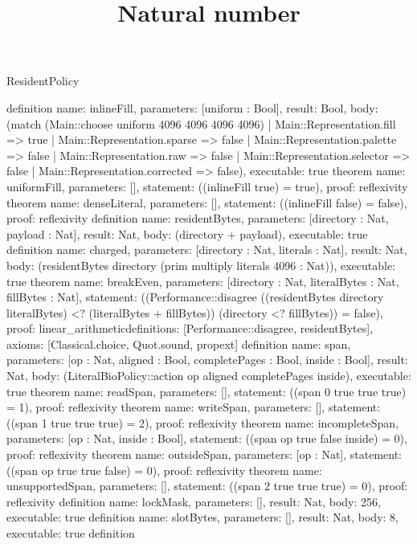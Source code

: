 \begin{lexlean}{ResidentPolicy}
\title{Natural number}
\begin{semanticmodule}
definition{
  name: inlineFill, parameters: [uniform : Bool], result: Bool,
  body: (match (Main::choose uniform 4096 4096 4096 4096)
    | Main::Representation.fill => true
    | Main::Representation.sparse => false
    | Main::Representation.palette => false
    | Main::Representation.raw => false
    | Main::Representation.selector => false
    | Main::Representation.corrected => false), executable: true
}
theorem{ name: uniformFill, parameters: [], statement: ((inlineFill true) = true), proof: reflexivity{} }
theorem{ name: denseLiteral, parameters: [], statement: ((inlineFill false) = false), proof: reflexivity{} }
definition{
  name: residentBytes, parameters: [directory : Nat, payload : Nat], result: Nat,
  body: (directory + payload), executable: true
}
definition{
  name: charged, parameters: [directory : Nat, literals : Nat], result: Nat,
  body: (residentBytes directory (prim multiply literals 4096 : Nat)), executable: true
}
theorem{
  name: breakEven, parameters: [directory : Nat, literalBytes : Nat, fillBytes : Nat],
  statement: ((Performance::disagree ((residentBytes directory literalBytes) <? (literalBytes + fillBytes))
    (directory <? fillBytes)) = false),
  proof: linear_arithmetic{definitions: [Performance::disagree, residentBytes]}, axioms: [Classical.choice, Quot.sound, propext]
}
definition{
  name: span, parameters: [op : Nat, aligned : Bool, completePages : Bool, inside : Bool], result: Nat,
  body: (LiteralBioPolicy::action op aligned completePages inside), executable: true
}
theorem{ name: readSpan, parameters: [], statement: ((span 0 true true true) = 1), proof: reflexivity{} }
theorem{ name: writeSpan, parameters: [], statement: ((span 1 true true true) = 2), proof: reflexivity{} }
theorem{ name: incompleteSpan, parameters: [op : Nat, inside : Bool], statement: ((span op true false inside) = 0), proof: reflexivity{} }
theorem{ name: outsideSpan, parameters: [op : Nat], statement: ((span op true true false) = 0), proof: reflexivity{} }
theorem{ name: unsupportedSpan, parameters: [], statement: ((span 2 true true true) = 0), proof: reflexivity{} }
definition{ name: lockMask, parameters: [], result: Nat, body: 256, executable: true }
definition{ name: slotBytes, parameters: [], result: Nat, body: 8, executable: true }
definition{
}
\end{semanticmodule}
\end{lexlean}
